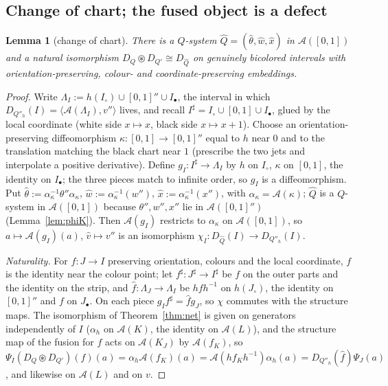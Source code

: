 \documentclass[11pt]{article}
\newtheorem{lemma}[theorem]{Lemma}
\theoremstyle{definition}
\theoremstyle{remark}
\newcommand{\cA}{\mathcal A}
\newcommand{\cfus}{\circledast}
\begin{document}
\subsection{Change of chart; the fused object is a defect}

\begin{lemma}[change of chart]\label{lem:chart}
There is a $Q$-system $\hat Q=(\hat\theta,\hat w,\hat x)$ in $\cA([0,1])$ and a natural isomorphism $D_Q\cfus D_{Q'}\cong D_{\hat Q}$ on genuinely bicolored intervals with orientation-preserving, colour- and coordinate-preserving embeddings.
\end{lemma}
\begin{proof}
Write $\Lambda_I:=h(I_\circ)\cup[0,1]''\cup I_\bullet$, the interval in which $D_{Q''_h}(I)=\langle\cA(\Lambda_I),v''\rangle$ lives, and recall $I^\sharp=I_\circ\cup[0,1]\cup I_\bullet$, glued by the local coordinate (white side $x\mapsto x$, black side $x\mapsto x+1$). Choose an orientation-preserving diffeomorphism $\kappa\colon[0,1]\to[0,1]''$ equal to $h$ near $0$ and to the translation matching the black chart near $1$ (prescribe the two jets and interpolate a positive derivative). Define $g_I\colon I^\sharp\to\Lambda_I$ by $h$ on $I_\circ$, $\kappa$ on $[0,1]$, the identity on $I_\bullet$; the three pieces match to infinite order, so $g_I$ is a diffeomorphism. Put $\hat\theta:=\alpha_\kappa^{-1}\theta''\alpha_\kappa$, $\hat w:=\alpha_\kappa^{-1}(w'')$, $\hat x:=\alpha_\kappa^{-1}(x'')$, with $\alpha_\kappa=\cA(\kappa)$; $\hat Q$ is a $Q$-system in $\cA([0,1])$ because $\theta'',w'',x''$ lie in $\cA([0,1]'')$ (Lemma~\ref{lem:phiK}). Then $\cA(g_I)$ restricts to $\alpha_\kappa$ on $\cA([0,1])$, so $a\mapsto\cA(g_I)(a)$, $\hat v\mapsto v''$ is an isomorphism $\chi_I\colon D_{\hat Q}(I)\to D_{Q''_h}(I)$.

\emph{Naturality.} For $f\colon J\to I$ preserving orientation, colours and the local coordinate, $f$ is the identity near the colour point; let $f^\sharp\colon J^\sharp\to I^\sharp$ be $f$ on the outer parts and the identity on the strip, and $\hat f\colon\Lambda_J\to\Lambda_I$ be $hfh^{-1}$ on $h(J_\circ)$, the identity on $[0,1]''$ and $f$ on $J_\bullet$. On each piece $g_If^\sharp=\hat fg_J$, so $\chi$ commutes with the structure maps. The isomorphism of Theorem~\ref{thm:net} is given on generators independently of $I$ ($\alpha_h$ on $\cA(K)$, the identity on $\cA(L)$), and the structure map of the fusion for $f$ acts on $\cA(K_J)$ by $\cA(f_K)$, so $\Psi_I(D_Q\cfus D_{Q'})(f)(a)=\alpha_h\cA(f_K)(a)=\cA(hf_Kh^{-1})\alpha_h(a)=D_{Q''_h}(\hat f)\Psi_J(a)$, and likewise on $\cA(L)$ and on $v$.
\end{proof}
\end{document}

